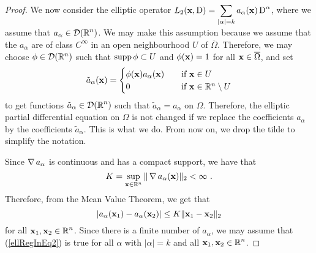 \begin{proof}
 We now consider the elliptic operator
$\displaystyle L_2(\mathbf{x},\operatorname{D})
= \sum_{|\alpha|= k} a_\alpha(\mathbf{x}) \operatorname{D}^\alpha$,
where we assume that $\displaystyle a_\alpha \in \mathcal{D}(\mathbb{R}^n)$.  We may make this
assumption because we assume that the $a_\alpha$ are of class
$\displaystyle C^\infty$ in an open neighbourhood $U$ of $\overline{\Omega}$.
Therefore, we may choose $\phi \in \mathcal{D}(\mathbb{R}^n)$ such that
$\operatorname{supp} \phi \subset U$ and $\phi(\mathbf{x}) = 1$ for all
$\mathbf{x} \in \overline{\Omega}$, and set
\[
\tilde{a}_{\alpha}(\mathbf{x})
= \begin{cases}
\phi(\mathbf{x}) a_{\alpha}(\mathbf{x}) & \quad \text{if} \ \mathbf{x} \in U \\
0 & \quad \text{if} \ \mathbf{x} \in \mathbb{R}^n \setminus U
\end{cases}
\]
to get functions $\displaystyle \tilde{a}_{\alpha} \in \mathcal{D}(\mathbb{R}^n)$ such that
$\tilde{a}_\alpha = a_\alpha$ on $\Omega$.  Therefore, the
elliptic partial differential equation on $\Omega$ is not changed if
we replace the coefficients $a_\alpha$ by the coefficients $\tilde{a}_\alpha$.
This is what we do.  From now on, we drop the tilde to simplify the notation.

Since $\operatorname{\nabla} a_\alpha$ is continuous and has a compact support,
we have that
\[
K = \sup_{\VEC{x} \in \RR^n} \|\graD a_\alpha (\VEC{x}) \|_2 < \infty \ .
\]
Therefore, from the Mean Value Theorem, we get that
\begin{equation} \label{ellRegInEq2}
\left| a_{\alpha}(\mathbf{x}_1) - a_\alpha(\mathbf{x}_2) \right| \leq K
\|\mathbf{x}_1 - \mathbf{x}_2 \|_2
\end{equation}
for all $\displaystyle \mathbf{x}_1, \mathbf{x}_2 \in \mathbb{R}^n$.  Since there
is a finite number of $a_\alpha$, we may assume that
(\ref{ellRegInEq2}) is true for all $\alpha$ with $|\alpha|=k$
and all $\displaystyle \mathbf{x}_1, \mathbf{x}_2 \in \mathbb{R}^n$.


\end{proof}
